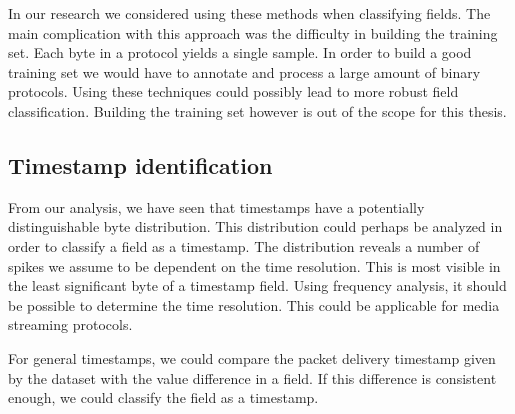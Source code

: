 \documentclass[a4paper]{report}
\begin{document}
In our research we considered using these methods when classifying fields.
The main complication with this approach was the difficulty in building the
training set. Each byte in a protocol yields a single sample. In order to
build a good training set we would have to annotate and process a large
amount of binary protocols. Using these techniques could possibly lead to
more robust field classification. Building the training set however is out
of the scope for this thesis.

\subsection{Timestamp identification}
From our analysis, we have seen that timestamps have a potentially
distinguishable byte distribution. This distribution could perhaps be analyzed
in order to classify a field as a timestamp. The distribution reveals a number
of spikes we assume to be dependent on the time resolution. This is most
visible in the least significant byte of a timestamp field. Using frequency
analysis, it should be possible to determine the time resolution. This could
be applicable for media streaming protocols.

For general timestamps, we could compare the packet delivery timestamp given
by the dataset with the value difference in a field. If this difference is
consistent enough, we could classify the field as a timestamp.



\end{document}

